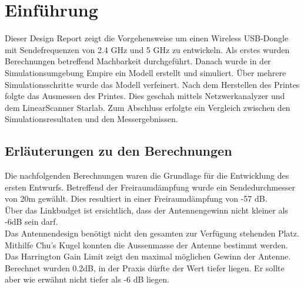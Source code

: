 \section{Einführung}
Dieser Design Report zeigt die Vorgehensweise um einen Wireless USB-Dongle mit Sendefrequenzen von 2.4 GHz und 5 GHz zu entwickeln. Als erstes wurden Berechnungen betreffend Machbarkeit durchgeführt. Danach wurde in der Simulationsumgebung Empire ein Modell erstellt und simuliert. Über mehrere Simulationsschritte wurde das Modell verfeinert. Nach dem Herstellen des Printes folgte das Ausmessen des Printes. Dies geschah mittels Netzwerkanalyzer und dem LinearScanner Starlab. Zum Abschluss erfolgte ein Vergleich zwischen den Simulationsresultaten und den Messergebnissen.

\subsection{Erläuterungen zu den Berechnungen}
Die nachfolgenden Berechnungen waren die Grundlage für die Entwicklung des ersten Entwurfs. 
Betreffend der Freiraumdämpfung wurde ein Sendedurchmesser von 20m gewählt. Dies resultiert in einer Freiraumdämpfung von -57 dB.\\
Über das Linkbudget ist ersichtlich, dass der Antennengewinn nicht kleiner als -6dB sein darf.\\
Das Antennendesign benötigt nicht den gesamten zur Verfügung stehenden Platz. Mithilfe Chu's Kugel konnten die Aussenmasse der Antenne bestimmt werden. Das Harrington Gain Limit zeigt den maximal möglichen Gewinn der Antenne. Berechnet wurden 0.2dB, in der Praxis dürfte der Wert tiefer liegen. Er sollte aber wie erwähnt nicht tiefer als -6 dB liegen.




